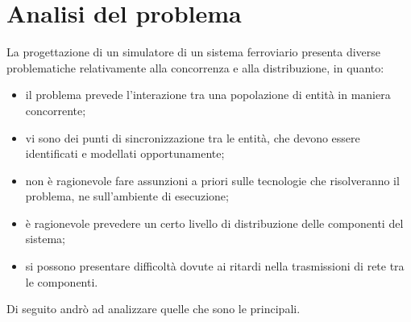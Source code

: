\chapter{Analisi del problema}

La progettazione di un simulatore di un sistema ferroviario presenta diverse problematiche relativamente alla concorrenza e alla distribuzione, in quanto:
\begin{itemize}
	\item il problema prevede l'interazione tra una popolazione di entità in maniera concorrente;
	\item vi sono dei punti di sincronizzazione tra le entità, che devono essere identificati e modellati opportunamente;
	\item non è ragionevole fare assunzioni a priori sulle tecnologie che risolveranno il problema, ne sull'ambiente di esecuzione;
	\item è ragionevole prevedere un certo livello di distribuzione delle componenti del sistema;
	\item si possono presentare difficoltà dovute ai ritardi nella trasmissioni di rete tra le componenti.
\end{itemize} 

Di seguito andrò ad analizzare quelle che sono le principali. 




